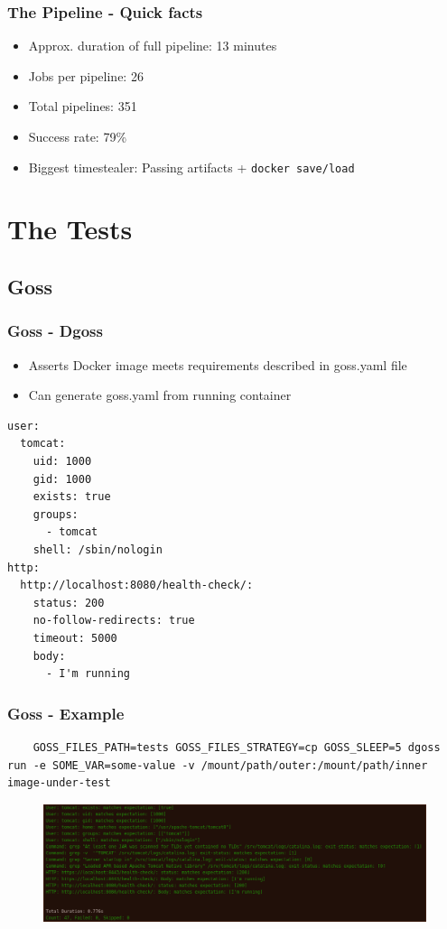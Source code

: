 \documentclass[14pt,aspectratio=169]{beamer}
\begin{document}
\begin{frame}
  \frametitle{The Pipeline - Quick facts}
  \begin{itemize}
    \item Approx. duration of full pipeline: 13 minutes
    \item Jobs per pipeline: 26
    \item Total pipelines: 351
    \item Success rate: 79\%
    \item Biggest timestealer: Passing artifacts + \texttt{docker save/load}
  \end{itemize}
\end{frame}

\section{The Tests}

\subsection{Goss}

\begin{frame}[fragile]
  \frametitle{Goss - Dgoss}
  \begin{itemize}
    \item Asserts Docker image meets requirements described in goss.yaml file
    \item Can generate goss.yaml from running container
  \end{itemize}

  \begin{verbatim}
user:
  tomcat:
    uid: 1000
    gid: 1000
    exists: true
    groups:
      - tomcat
    shell: /sbin/nologin
http:
  http://localhost:8080/health-check/:
    status: 200
    no-follow-redirects: true
    timeout: 5000
    body:
      - I'm running
  \end{verbatim}
\end{frame}

\begin{frame}[fragile]
  \frametitle{Goss - Example}
  \begin{verbatim}
    GOSS_FILES_PATH=tests GOSS_FILES_STRATEGY=cp GOSS_SLEEP=5 dgoss run -e SOME_VAR=some-value -v /mount/path/outer:/mount/path/inner image-under-test
  \end{verbatim}
  \begin{figure}
    \includegraphics[width=\textwidth]{images/goss.png}
  \end{figure}
\end{frame}
\end{document}
